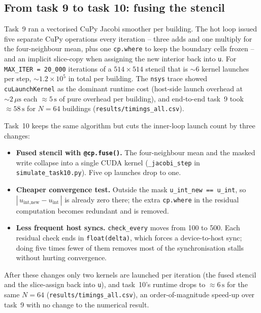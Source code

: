 
\subsection{From task 9 to task 10: fusing the stencil}

Task~9 ran a vectorised CuPy Jacobi smoother per building.
The hot loop issued five separate CuPy operations every iteration --
three adds and one multiply for the four-neighbour mean, plus one
\verb|cp.where| to keep the boundary cells frozen -- and an implicit
slice-copy when assigning the new interior back into \verb|u|.
For \verb|MAX_ITER = 20_000| iterations of a $514 \times 514$ stencil
that is ${\sim}6$ kernel launches per step, ${\sim}1.2 \times 10^{5}$
in total per building.
The \verb|nsys| trace showed \verb|cuLaunchKernel| as the dominant
runtime cost (host-side launch overhead at ${\sim}2\,\mu\text{s}$
each $\approx 5\,\text{s}$ of pure overhead per building),
and end-to-end task~9 took ${\approx}58\,\text{s}$ for $N = 64$
buildings (\verb|results/timings_all.csv|).

Task~10 keeps the same algorithm but cuts the inner-loop launch count
by three changes:

\begin{itemize}
  \item \textbf{Fused stencil with \texttt{@cp.fuse()}.}
        The four-neighbour mean and the masked write collapse into a
        single CUDA kernel
        (\verb|_jacobi_step| in \verb|simulate_task10.py|).
        Five op launches drop to one.
  \item \textbf{Cheaper convergence test.}
        Outside the mask
        \verb|u_int_new == u_int|, so
        $|\,u_{\text{int,new}} - u_{\text{int}}\,|$ is already zero
        there; the extra \verb|cp.where| in the residual computation
        becomes redundant and is removed.
  \item \textbf{Less frequent host syncs.}
        \verb|check_every| moves from 100 to 500. Each residual check
        ends in \verb|float(delta)|, which forces a device-to-host
        sync; doing five times fewer of them removes most of the
        synchronisation stalls without hurting convergence.
\end{itemize}

\noindent
After these changes only two kernels are launched per iteration
(the fused stencil and the slice-assign back into \verb|u|), and
task~10's runtime drops to ${\approx}6\,\text{s}$ for the same
$N = 64$ (\verb|results/timings_all.csv|), an order-of-magnitude
speed-up over task~9 with no change to the numerical result.


